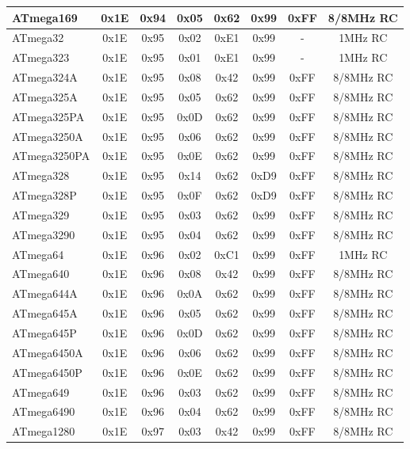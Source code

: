 \begin{table}[H]
\begin{center}
\begin{tabular}{| l | c | c | c || c | c | c | c |}
    \hline
ATmega169  & 0x1E & 0x94  & 0x05 & 0x62 & 0x99 & 0xFF & 8/8MHz RC \\
    \hline
ATmega32   & 0x1E & 0x95  & 0x02 & 0xE1 & 0x99 &  -  & 1MHz RC \\
    \hline
ATmega323  & 0x1E & 0x95  & 0x01 & 0xE1 & 0x99 &  -  & 1MHz RC \\
    \hline
ATmega324A & 0x1E & 0x95  & 0x08 & 0x42 & 0x99 & 0xFF & 8/8MHz RC \\
    \hline
ATmega325A & 0x1E & 0x95  & 0x05 & 0x62 & 0x99 & 0xFF & 8/8MHz RC \\
    \hline
ATmega325PA & 0x1E & 0x95  & 0x0D & 0x62 & 0x99 & 0xFF & 8/8MHz RC \\
    \hline
ATmega3250A & 0x1E & 0x95  & 0x06 & 0x62 & 0x99 & 0xFF & 8/8MHz RC \\
    \hline
ATmega3250PA & 0x1E & 0x95  & 0x0E & 0x62 & 0x99 & 0xFF & 8/8MHz RC \\
    \hline
ATmega328  & 0x1E & 0x95  & 0x14 & 0x62 & 0xD9 & 0xFF & 8/8MHz RC \\
    \hline
ATmega328P & 0x1E & 0x95  & 0x0F & 0x62 & 0xD9 & 0xFF & 8/8MHz RC \\
    \hline
ATmega329  & 0x1E & 0x95  & 0x03 & 0x62 & 0x99 & 0xFF & 8/8MHz RC \\
    \hline
ATmega3290 & 0x1E & 0x95  & 0x04 & 0x62 & 0x99 & 0xFF & 8/8MHz RC \\
    \hline
ATmega64   & 0x1E & 0x96  & 0x02 & 0xC1 & 0x99 & 0xFF & 1MHz RC \\
    \hline
ATmega640  & 0x1E & 0x96  & 0x08 & 0x42 & 0x99 & 0xFF & 8/8MHz RC \\
    \hline
ATmega644A & 0x1E & 0x96  & 0x0A & 0x62 & 0x99 & 0xFF & 8/8MHz RC \\
    \hline
ATmega645A & 0x1E & 0x96  & 0x05 & 0x62 & 0x99 & 0xFF & 8/8MHz RC \\
    \hline
ATmega645P & 0x1E & 0x96  & 0x0D & 0x62 & 0x99 & 0xFF & 8/8MHz RC \\
    \hline
ATmega6450A & 0x1E & 0x96  & 0x06 & 0x62 & 0x99 & 0xFF & 8/8MHz RC \\
    \hline
ATmega6450P & 0x1E & 0x96  & 0x0E & 0x62 & 0x99 & 0xFF & 8/8MHz RC \\
    \hline
ATmega649  & 0x1E & 0x96  & 0x03 & 0x62 & 0x99 & 0xFF & 8/8MHz RC \\
    \hline
ATmega6490 & 0x1E & 0x96  & 0x04 & 0x62 & 0x99 & 0xFF & 8/8MHz RC \\
    \hline
ATmega1280 & 0x1E & 0x97  & 0x03 & 0x42 & 0x99 & 0xFF & 8/8MHz RC \\

\end{tabular}
\end{center}
\end{table}
